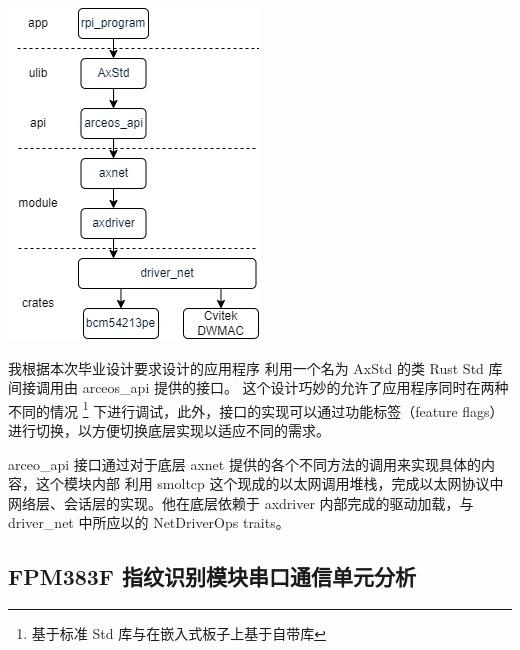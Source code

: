    \noindent
    \begin{minipage}[t]{0.40\linewidth}
            \vspace{0pt}
            \centering
            \includegraphics[scale=0.6]{./imgs/ArceOS_网络调用.jpg}
                \label{fig::ArceOS网络调用}
        \end{minipage}           
        \quad
        \begin{minipage}[t]{0.55\linewidth}
            \vspace{0pt}
            \setlength{\parindent}{1em}

            我根据本次毕业设计要求设计的应用程序
            利用一个名为 AxStd 的类 Rust Std 库间接调用由 arceos\_api 提供的接口。
            这个设计巧妙的允许了应用程序同时在两种不同的情况
            \footnote{基于标准 Std 库与在嵌入式板子上基于自带库}
            下进行调试，此外，接口的实现可以通过功能标签（feature flags）进行切换，以方便切换底层实现以适应不同的需求。

            arceo\_api 接口通过对于底层 axnet 提供的各个不同方法的调用来实现具体的内容，这个模块内部
            利用 smoltcp 这个现成的以太网调用堆栈，完成以太网协议中网络层、会话层的实现。他在底层依赖于
            axdriver 内部完成的驱动加载，与 driver\_net 中所应以的 NetDriverOps traits。           

        \end{minipage}



    \subsection{FPM383F 指纹识别模块串口通信单元分析}

